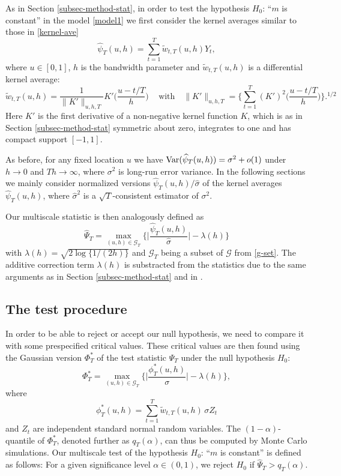 \documentclass[a4paper,12pt]{article}
\numberwithin{equation}{section}
\begin{document}
As in Section \ref{subsec-method-stat}, in order to test the hypothesis $H_0$: ``$m$ is constant'' in the model \eqref{model1} we first consider the kernel averages similar to those in \eqref{kernel-ave}
\begin{equation}\label{kernel-ave-shape}
\widehat{\psi}_T(u,h) = \sum\limits_{t=1}^T \widetilde{w}_{t,T}(u,h) Y_t, 
\end{equation}
where $u\in [0,1]$, $h$ is the bandwidth parameter and $\widetilde{w}_{t,T}(u,h)$ is a differential kernel average: 
\[ \widetilde{w}_{t,T}(u,h) = \frac{1}{\|K'\|_{u,h,T}} K'\Big( \frac{u - t/T}{h} \Big) \, \quad \text{with} \quad \|K'\|_{u,h,T} = \Big\{\sum\limits_{t=1}^T  (K')^2\Big( \frac{u - t/T}{h} \Big)\Big\}.^{1/2} \]
Here $K'$ is the first derivative of a non-negative kernel function $K$, which is as in Section \ref{subsec-method-stat} symmetric about zero, integrates to one and has compact support $[-1,1]$.

As before, for any fixed location $u$ we have $\textnormal{Var}(\widehat{\psi}_T(u,h)) = \sigma^2 + o(1)$ under $h \rightarrow 0$ and $Th \rightarrow \infty$, where $\sigma^2$ is long-run error variance. In the following sections we mainly consider normalized versions $\widehat{\psi}_T(u,h)/\widehat{\sigma}$ of the kernel averages $\widehat{\psi}_T(u,h)$, where $\widehat{\sigma}^2$ is a $\sqrt{T}$-consistent estimator of $\sigma^2$.

Our multiscale statistic is then analogously defined as 
\[ \widehat{\Psi}_T = \max_{(u,h) \in \mathcal{G}_T} \Big\{ \Big|\frac{\widehat{\psi}_T(u,h)}{\widehat{\sigma}}\Big| - \lambda(h) \Big\} \] 
with $\lambda(h) = \sqrt{2 \log \{ 1/(2h) \}}$ and $\mathcal{G}_T$ being a subset of $\mathcal{G}$ from \eqref{g-set}. The additive correction term $\lambda(h)$ is substracted from the statistics due to the same arguments as in Section \ref{subsec-method-stat} and in \cite{DuembgenSpokoiny2001}.


\subsection{The test procedure}\label{subsec-test-shape-test}

In order to be able to reject or accept our null hypothesis, we need to compare it with some prespecified critical values. These critical values are then found using the Gaussian version $\Phi_T^*$ of the test statistic $\widehat{\Psi}_T$ under the null hypothesis $H_0$:
\[ \Phi_T^* = \max_{(u,h) \in \mathcal{G}_T} \Big\{ \Big|\frac{\phi_T^*(u,h)}{\sigma}\Big| - \lambda(h) \Big\}, \] 
where
\[ \phi_T^*(u,h) = \sum\limits_{t=1}^T \tilde{w}_{t,T}(u,h) \, \sigma Z_t \]
and $Z_t$ are independent standard normal random variables. The $(1-\alpha)$-quantile of $\Phi_T^*$, denoted further as $q_T(\alpha)$, can thus be computed by Monte Carlo simulations. Our multiscale test of the hypothesis $H_0$: ``$m$ is constant'' is defined as follows: For a given significance level $\alpha \in (0,1)$, we reject $H_0$ if $\widehat{\Psi}_T > q_T(\alpha)$. 
\end{document}
